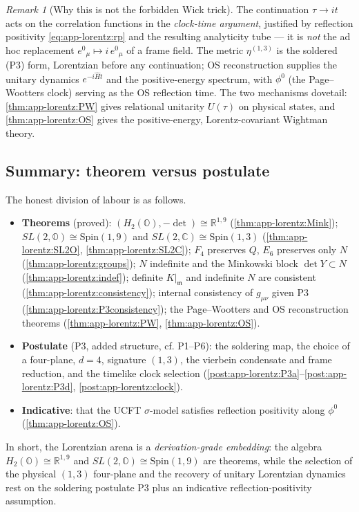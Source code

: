 \documentclass[11pt]{article}
\theoremstyle{plain}
\theoremstyle{definition}
\theoremstyle{remark}
\newtheorem{remark}[theorem]{Remark}
\begin{document}
\begin{remark}[Why this is not the forbidden Wick trick]
\label{rmk:app-lorentz:notwick}
The continuation $\tau\to it$ acts on the correlation functions in the
\emph{clock-time argument}, justified by reflection positivity
\eqref{eq:app-lorentz:rp} and the resulting analyticity tube --- it is \emph{not} the
ad hoc replacement $e^{0}{}_{\mu}\mapsto i\,e^{0}{}_{\mu}$ of a frame field. The
metric $\eta^{(1,3)}$ is the soldered (P3) form, Lorentzian before any continuation;
OS reconstruction supplies the unitary dynamics $e^{-i\hat{H}t}$ and the
positive-energy spectrum, with $\phi^{0}$ (the Page--Wootters clock) serving as the
OS reflection time. The two mechanisms dovetail:
\autoref{thm:app-lorentz:PW} gives relational unitarity $U(\tau)$ on physical states,
and \autoref{thm:app-lorentz:OS} gives the positive-energy, Lorentz-covariant
Wightman theory.
\end{remark}

\subsection{Summary: theorem versus postulate}
\label{subsec:app-lorentz:summary}

The honest division of labour is as follows.
\begin{itemize}
\item \textbf{Theorems} (proved): $(H_{2}(\mathbb{O}),-\det)\cong\mathbb{R}^{1,9}$
  (\autoref{thm:app-lorentz:Mink}); $SL(2,\mathbb{O})\cong\mathrm{Spin}(1,9)$ and
  $SL(2,\mathbb{C})\cong\mathrm{Spin}(1,3)$
  (\autoref{thm:app-lorentz:SL2O}, \autoref{thm:app-lorentz:SL2C}); $F_{4}$ preserves
  $Q$, $E_{6}$ preserves only $N$ (\autoref{thm:app-lorentz:groups}); $N$ indefinite
  and the Minkowski block $\det Y\subset N$ (\autoref{thm:app-lorentz:indef});
  definite $K|_{\mathfrak{m}}$ and indefinite $N$ are consistent
  (\autoref{thm:app-lorentz:consistency}); internal consistency of $g_{\mu\nu}$ given
  P3 (\autoref{thm:app-lorentz:P3consistency}); the Page--Wootters and OS
  reconstruction theorems (\autoref{thm:app-lorentz:PW}, \autoref{thm:app-lorentz:OS}).
\item \textbf{Postulate} (P3, added structure, cf. P1--P6): the soldering map, the
  choice of a four-plane, $d=4$, signature $(1,3)$, the vierbein condensate and frame
  reduction, and the timelike clock selection
  (\autoref{post:app-lorentz:P3a}--\autoref{post:app-lorentz:P3d},
  \autoref{post:app-lorentz:clock}).
\item \textbf{Indicative}: that the UCFT $\sigma$-model satisfies reflection
  positivity along $\phi^{0}$ (\autoref{thm:app-lorentz:OS}).
\end{itemize}
In short, the Lorentzian arena is a \emph{derivation-grade embedding}: the algebra
$H_{2}(\mathbb{O})\cong\mathbb{R}^{1,9}$ and $SL(2,\mathbb{O})\cong\mathrm{Spin}(1,9)$
are theorems, while the selection of the physical $(1,3)$ four-plane and the recovery
of unitary Lorentzian dynamics rest on the soldering postulate P3 plus an indicative
reflection-positivity assumption.
\end{document}
